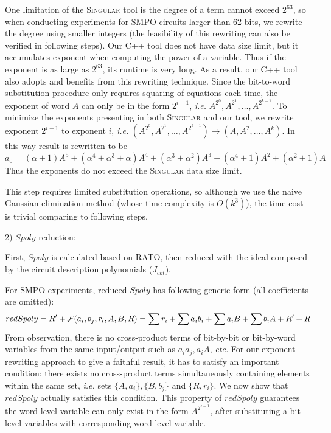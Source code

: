 One limitation of the \textsc{Singular} tool is the degree of a term cannot exceed $2^{63}$, so when conducting experiments 
for SMPO circuits larger than
62 bits, we rewrite the degree using smaller integers (the feasibility of this rewriting can also be verified 
in following steps). Our C++ tool does not have data size limit, but it accumulates exponent when computing 
the power of a variable. Thus if the exponent is as large as $2^{63}$, its runtime is very long. As a 
result, our C++ tool also adopts and benefits from this rewriting technique.
Since the bit-to-word substitution procedure
only requires squaring of equations each time, the exponent of word $A$ can only be in the form $2^{i-1}$, {\it i.e.} 
$A^{2^0},A^{2^1},\dots,A^{2^{k-1}}$. To minimize the exponents presenting in both \textsc{Singular} and our tool, 
we rewrite exponent $2^{i-1}$ to exponent $i$, {\it i.e.}
$(A^{2^0},A^{2^1},\dots,A^{2^{k-1}}) \to (A, A^2, \dots, A^k)$. In this way result is rewritten to be
$$a_0 = (\alpha+1)A^5+(\alpha^4+\alpha^3+\alpha)A^4+(\alpha^3+\alpha^2)A^3+(\alpha^4+1)A^2+(\alpha^2+1)A$$
Thus the exponents do not exceed the \textsc{Singular} data size limit.

This step requires limited substitution operations, so although we use the naive Gaussian elimination
method (whose time complexity is $O(k^3)$), the time cost is trivial comparing to following steps. 

2) $Spoly$ reduction:

First, $Spoly$ is calculated based on RATO, then reduced with the ideal composed by the circuit description polynomials ($J_{ckt}$).

For SMPO experiments, reduced $Spoly$ has following generic form (all coefficients are omitted):
\begin{equation}
\label{eqn:redSpoly}
redSpoly = R'+{\mathcal{F}}(a_i,b_j,r_l,A,B,R) = \sum r_i + \sum a_ib_i + \sum a_iB + \sum b_iA + R' + R
\end{equation}
From observation, there is no cross-product terms of bit-by-bit or bit-by-word variables from the same input/output
such as $a_ia_j, a_iA$, {\it etc.} 
For our exponent rewriting approach to give a faithful result, it has to satisfy an important condition:
there exists no cross-product terms simultaneously containing elements within the same set, {\it i.e. } sets
$\{A,a_i\},\{B,b_j\}$ and $\{R,r_i\}$.
We now show that $redSpoly$ actually satisfies this condition.
This property of $redSpoly$ guarantees the word level variable can only exist in the form $A^{2^{i-1}}$,
after substituting a bit-level variables with corresponding word-level variable.

